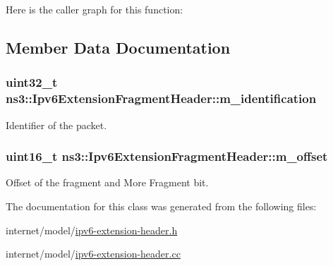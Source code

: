 Here is the caller graph for this function\+:




\subsection{Member Data Documentation}
\subsubsection[{\texorpdfstring{m\+\_\+identification}{m_identification}}]{\setlength{\rightskip}{0pt plus 5cm}uint32\+\_\+t ns3\+::\+Ipv6\+Extension\+Fragment\+Header\+::m\+\_\+identification\hspace{0.3cm}{\ttfamily [private]}}\hypertarget{classns3_1_1Ipv6ExtensionFragmentHeader_a493d1bb240172953356d460041a895b6}{}\label{classns3_1_1Ipv6ExtensionFragmentHeader_a493d1bb240172953356d460041a895b6}


Identifier of the packet. 

\subsubsection[{\texorpdfstring{m\+\_\+offset}{m_offset}}]{\setlength{\rightskip}{0pt plus 5cm}uint16\+\_\+t ns3\+::\+Ipv6\+Extension\+Fragment\+Header\+::m\+\_\+offset\hspace{0.3cm}{\ttfamily [private]}}\hypertarget{classns3_1_1Ipv6ExtensionFragmentHeader_a95f8f36dd6cf53ec12db5322cfb85a11}{}\label{classns3_1_1Ipv6ExtensionFragmentHeader_a95f8f36dd6cf53ec12db5322cfb85a11}


Offset of the fragment and More Fragment bit. 



The documentation for this class was generated from the following files\+:\begin{DoxyCompactItemize}
\item 
internet/model/\hyperlink{ipv6-extension-header_8h}{ipv6-\/extension-\/header.\+h}\item 
internet/model/\hyperlink{ipv6-extension-header_8cc}{ipv6-\/extension-\/header.\+cc}\end{DoxyCompactItemize}
